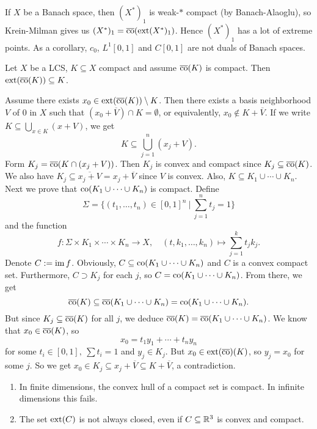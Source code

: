 \begin{example}
  If $X$ be a Banach space, then $(X^*)_1$ is weak-$*$ compact (by Banach-Alaoglu),
  so Krein-Milman gives us $(X^*)_1 = \overline{\operatorname{co}} (\operatorname{ext} (X^*)_1)$. Hence $(X^*)_1$ has a lot of extreme points.
  As a corollary, $c_0$, $L^1 [0, 1]$ and $C[0, 1]$ are not duals of Banach spaces.
\end{example}

\begin{theorem}[Milman]
  Let $X$ be a LCS, $K \subseteq X$ compact and assume $\overline{\operatorname{co}} (K)$ is compact.
  Then $\operatorname{ext} (\overline{\operatorname{co}} (K)) \subseteq K$.
\end{theorem}

\begin{myproof}
  Assume there exists $x_0 \in \operatorname{ext} (\overline{\operatorname{co}} (K)) \setminus K$.
  Then there exists a basis neighborhood $V$ of $0$ in $X$ such that 
  $(x_0 + \overline{V}) \cap K = \emptyset$, or equivalently, $x_0 \notin K + \overline{V}$.
  If we write 
  $K \subseteq \bigcup_{x \in K} (x + V)$, 
  we get 
  $$K \subseteq \bigcup_{j = 1} ^{n} (x_j + V).$$
  Form $K_j = \overline{\operatorname{co}} (K \cap (x_j + V))$.
  Then $K_j$ is convex and compact since $K_j \subseteq \overline{\operatorname{co}} (K)$.
  We also have $K_j \subseteq \overline{x_j + V} = x_j + \overline{V}$ since $V$ is convex.
  Also, $K \subseteq K_1 \cup \cdots \cup K_n$.
  Next we prove that $\operatorname{co} (K_1 \cup \cdots \cup K_n)$ is compact.
  Define $$\Sigma = \{(t_1, \dots, t_n) \in [0, 1]^n\ |\ \sum_{j = 1} ^n t_j = 1\}$$
  and the function 
  $$f: \Sigma \times K_1 \times \cdots \times K_n \to X,\quad (t, k_1, \dots, k_n) \mapsto \sum_{j = 1} ^k t_j k_j.$$
  Denote $C := \operatorname{im} f$.
  Obviously, $C \subseteq \operatorname{co} (K_1 \cup \cdots \cup K_n)$ and $C$ is a convex compact set.
  Furthermore, $C \supset K_j$ for each $j$, so $C = \operatorname{co} (K_1 \cup \cdots \cup K_n)$.
  From there, we get 
  $$\overline{\operatorname{co}} (K) \subseteq \overline{\operatorname{co}} (K_1 \cup \cdots \cup K_n) = {\operatorname{co}} (K_1 \cup \cdots \cup K_n).$$
  But since $K_j \subseteq \overline{\operatorname{co}} (K)$ for all $j$, we deduce $\overline{\operatorname{co}} (K) = \overline{\operatorname{co}} (K_1 \cup \cdots \cup K_n)$.
  We know that $x_0 \in \overline{\operatorname{co}} (K)$, so $$x_0 = t_1 y_1 + \cdots + t_n y_n$$
  for some $t_i \in [0, 1],\ \sum t_i = 1$ and $y_j \in K_j$.
  But $x_0 \in \operatorname{ext} (\overline{\operatorname{co}})(K)$, so $y_j = x_0$ for some $j$. So we get 
  $x_0 \in K_j \subseteq x_j + \overline{V} \subseteq K + \overline{V}$,
  a contradiction.
\end{myproof}

\begin{remark}
  \begin{enumerate}
    \item In finite dimensions, the convex hull of a compact set is compact.
    In infinite dimensions this fails.
    \item The set $\operatorname{ext} (C)$ is not always closed, even if $C \subseteq \mathbb {R}^3$ is convex and compact. 
  \end{enumerate}
\end{remark}